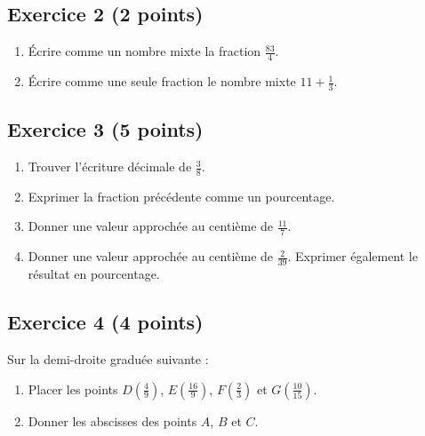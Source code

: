 \documentclass[14 pt]{extarticle}
\theoremstyle{plain}
\begin{document}
\subsection*{Exercice 2 (2 points)}
\begin{enumerate}
\item Écrire comme un nombre mixte la fraction $\frac{83}{4}$.
\item Écrire comme une seule fraction le nombre mixte $11+ \frac13$.
\end{enumerate}
\subsection*{Exercice 3 (5 points)}
\begin{enumerate}
\item Trouver l'écriture décimale de $\frac{3}8$. 
\item Exprimer la fraction précédente comme un pourcentage.
\item Donner une valeur approchée au centième de $\frac{11}7$. 
\item Donner une valeur approchée au centième de $\frac{2}{39}$. Exprimer également le résultat en pourcentage.
\end{enumerate}

\subsection*{Exercice 4 (4 points)}
Sur la demi-droite graduée suivante : 

\begin{enumerate}
\item Placer les points $D\left(\frac49\right)$, $E\left(\frac{16}9\right)$, $F\left(\frac23\right)$ et $G\left(\frac{10}{15}\right)$.
\item Donner les abscisses des points $A$, $B$ et $C$.
\end{enumerate}  
\end{document}
